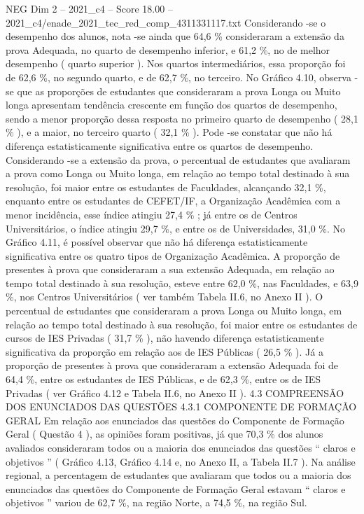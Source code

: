 \begin{textsample}{NEG Dim 2 – 2021\_c4 – Score 18.00 – 2021\_c4/enade\_2021\_tec\_red\_comp\_4311331117.txt}
Considerando -se o desempenho dos alunos, nota -se ainda que 64,6 \% consideraram a extensão da prova Adequada, no quarto de desempenho inferior, e 61,2 \%, no de melhor desempenho ( quarto superior ).
Nos quartos intermediários, essa proporção foi de 62,6 \%, no segundo quarto, e de 62,7 \%, no terceiro.
No Gráfico 4.10, observa -se que as proporções de estudantes que consideraram a prova Longa ou Muito longa apresentam tendência crescente em função dos quartos de desempenho, sendo a menor proporção dessa resposta no primeiro quarto de desempenho ( 28,1 \% ), e a maior, no terceiro quarto ( 32,1 \% ).
Pode -se constatar que não há diferença estatisticamente significativa entre os quartos de desempenho.
Considerando -se a extensão da prova, o percentual de estudantes que avaliaram a prova como Longa ou Muito longa, em relação ao tempo total destinado à sua resolução, foi maior entre os estudantes de Faculdades, alcançando 32,1 \%, enquanto entre os estudantes de CEFET/IF, a Organização Acadêmica com a menor incidência, esse índice atingiu 27,4 \% ; já entre os de Centros Universitários, o índice atingiu 29,7 \%, e entre os de Universidades, 31,0 \%.
No Gráfico 4.11, é possível observar que não há diferença estatisticamente significativa entre os quatro tipos de Organização Acadêmica.
A proporção de presentes à prova que consideraram a sua extensão Adequada, em relação ao tempo total destinado à sua resolução, esteve entre 62,0 \%, nas Faculdades, e 63,9 \%, nos Centros Universitários ( ver também Tabela II.6, no Anexo II ).
O percentual de estudantes que consideraram a prova Longa ou Muito longa, em relação ao tempo total destinado à sua resolução, foi maior entre os estudantes de cursos de IES Privadas ( 31,7 \% ), não havendo diferença estatisticamente significativa da proporção em relação aos de IES Públicas ( 26,5 \% ).
Já a proporção de presentes à prova que consideraram a extensão Adequada foi de 64,4 \%, entre os estudantes de IES Públicas, e de 62,3 \%, entre os de IES Privadas ( ver Gráfico 4.12 e Tabela II.6, no Anexo II ). 4.3 COMPREENSÃO DOS ENUNCIADOS DAS QUESTÕES 4.3.1 COMPONENTE DE FORMAÇÃO GERAL Em relação aos enunciados das questões do Componente de Formação Geral ( Questão 4 ), as opiniões foram positivas, já que 70,3 \% dos alunos avaliados consideraram todos ou a maioria dos enunciados das questões “ claros e objetivos ” ( Gráfico 4.13, Gráfico 4.14 e, no Anexo II, a Tabela II.7 ).
Na análise regional, a percentagem de estudantes que avaliaram que todos ou a maioria dos enunciados das questões do Componente de Formação Geral estavam “ claros e objetivos ” variou de 62,7 \%, na região Norte, a 74,5 \%, na região Sul.

\end{textsample}
